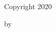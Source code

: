 \begin{center}
  \makeatletter
  \Large{\@title} \par
  \vspace{1in}  Copyright 2020\par
  \vspace{.1in} by\par
  \vspace{.1in} \@author
  \makeatother
\end{center}
